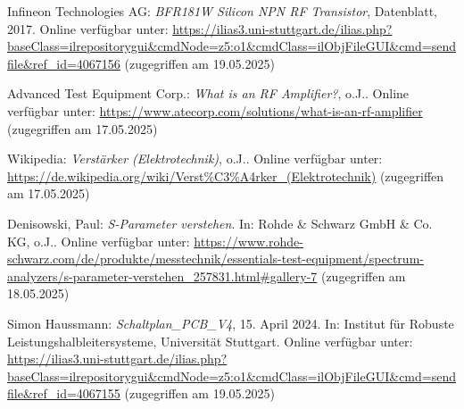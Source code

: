 \begin{thebibliography}{1}
Infineon Technologies AG: \emph{BFR181W Silicon NPN RF Transistor}, Datenblatt, 2017. Online verfügbar unter: \url{https://ilias3.uni-stuttgart.de/ilias.php?baseClass=ilrepositorygui&cmdNode=z5:o1&cmdClass=ilObjFileGUI&cmd=sendfile&ref_id=4067156} (zugegriffen am 19.05.2025)

Advanced Test Equipment Corp.: \emph{What is an RF Amplifier?}, o.J.. Online verfügbar unter: \url{https://www.atecorp.com/solutions/what-is-an-rf-amplifier} (zugegriffen am 17.05.2025)

Wikipedia: \emph{Verstärker (Elektrotechnik)}, o.J.. Online verfügbar unter: \url{https://de.wikipedia.org/wiki/Verst%C3%A4rker_(Elektrotechnik)} (zugegriffen am 17.05.2025)

Denisowski, Paul: \emph{S-Parameter verstehen}. In: Rohde \& Schwarz GmbH \& Co. KG, o.J.. Online verfügbar unter: \url{https://www.rohde-schwarz.com/de/produkte/messtechnik/essentials-test-equipment/spectrum-analyzers/s-parameter-verstehen_257831.html#gallery-7} (zugegriffen am 18.05.2025)

Simon Haussmann: \emph{Schaltplan\_PCB\_V4}, 15. April 2024. In: Institut für Robuste Leistungshalbleitersysteme, Universität Stuttgart. Online verfügbar unter: \url{https://ilias3.uni-stuttgart.de/ilias.php?baseClass=ilrepositorygui&cmdNode=z5:o1&cmdClass=ilObjFileGUI&cmd=sendfile&ref_id=4067155} (zugegriffen am 19.05.2025)
\end{thebibliography}

%
\clearpage